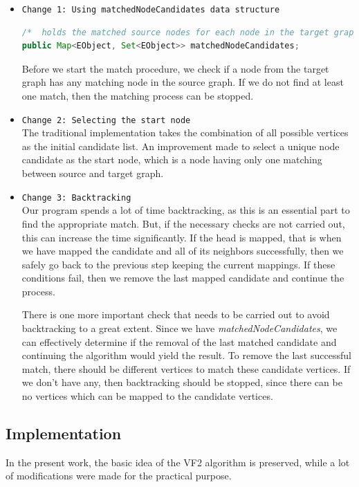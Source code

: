\begin{itemize}
\item \texttt{Change 1: Using matchedNodeCandidates data structure}
\begin{lstlisting}[language = Java,frame = single]
/*  holds the matched source nodes for each node in the target graph */
public Map<EObject, Set<EObject>> matchedNodeCandidates; 
\end{lstlisting}

Before we start the match procedure, we check if a node from the target graph has any matching node in the source graph. If we do not find at least one match, then the matching process can be stopped.

\item \texttt{Change 2: Selecting the start node}\\
The traditional implementation takes the combination of all possible vertices as the initial candidate list. An improvement made to select a unique node candidate as the start node, which is a node having only one matching between source and target graph.

\item \texttt{Change 3: Backtracking}\\
Our program spends a lot of time backtracking, as this is an essential part to find the appropriate match. But, if the necessary checks are not carried out, this can increase the time significantly. If the head is mapped, that is when we have mapped the candidate and all of its neighbors successfully, then we safely go back to the previous step keeping the current mappings. If these conditions fail, then we remove the last mapped candidate and continue the process.

There is one more important check that needs to be carried out to avoid backtracking to a great extent. Since we have \textit{matchedNodeCandidates}, we can effectively determine if the removal of the last matched candidate and continuing the algorithm would yield the result. To remove the last successful match, there should be different vertices to match these candidate vertices. If we don't have any, then backtracking should be stopped, since there can be no vertices which can be mapped to the candidate vertices.

\end{itemize}

\subsection{Implementation}
In the present work, the basic idea of the VF2 algorithm is preserved, while a lot of modifications were made for the practical purpose.
 
